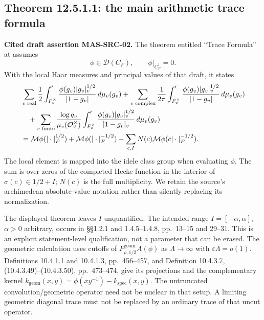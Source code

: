\documentclass[11pt,a4paper]{article}
\newcommand{\M}{\mathcal M}
\newcommand{\cD}{\mathcal D}
\begin{document}
\subsection{Theorem 12.5.1.1: the main arithmetic trace formula}
\textbf{Cited draft assertion MAS-SRC-02.} The theorem entitled ``Trace Formula'' at \cite[Theorem 12.5.1.1, pp.~519--520, (12.5.1.1)--(12.5.1.3)]{masullo} assumes
\[
 \phi\in\cD(C_F),\qquad \phi|_{C_F^1}=0.
\]
With the local Haar measures and principal values of that draft, it states
\begin{align}
 &\sum_{v\text{ real}}\frac12\int_{F_v^\times}'
       \frac{\phi(g_v)|g_v|_v^{1/2}}{|1-g_v|}\,d\mu_v(g_v)
 +\sum_{v\text{ complex}}\frac1{2\pi}\int_{F_v^\times}'
       \frac{\phi(g_v)|g_v|_v^{1/2}}{|1-g_v|}\,d\mu_v(g_v)\notag\\
 &\quad+\sum_{v\text{ finite}}\frac{\log q_v}{\mu_v(\mathcal O_v^\times)}
       \int_{F_v^\times}'\frac{\phi(g_v)|g_v|_v^{1/2}}{|1-g_v|_v}\,d\mu_v(g_v)\notag\\
 &=\M\phi(|\cdot|_F^{1/2})+\M\phi(|\cdot|_F^{-1/2})
   -\sum_{c,I}N(c)\M\phi(c|\cdot|_F^{-1/2}).\label{eq:masmain}
\end{align}
The local element is mapped into the idele class group when evaluating $\phi$. The sum is over zeros of the completed Hecke function in the interior of $\sigma(c)\in1/2+I$; $N(c)$ is the full multiplicity. We retain the source's archimedean absolute-value notation rather than silently replacing its normalization.

The displayed theorem leaves $I$ unquantified. The intended range $I=[-\alpha,\alpha]$, $\alpha>0$ arbitrary, occurs in \S\S1.2.1 and 1.4.5--1.4.8, pp.~13--15 and 29--31. This is an explicit statement-level qualification, not a parameter that can be erased. The geometric calculation uses cutoffs of $P^{\mathrm{geom}}_{\rho,1/2}A(\phi)$ as $\Lambda\to\infty$ with $\varepsilon\Lambda=o(1)$. Definitions 10.4.1.1 and 10.4.1.3, pp.~456--457, and Definition 10.4.3.7, (10.4.3.49)--(10.4.3.50), pp.~473--474, give its projections and the complementary kernel
$k_{\mathrm{geom}}(x,y)=\phi(xy^{-1})-k_{\mathrm{spec}}(x,y)$.
The untruncated convolution/geometric operator need not be nuclear in that setup. A limiting geometric diagonal trace must not be replaced by an ordinary trace of that uncut operator.
\end{document}
